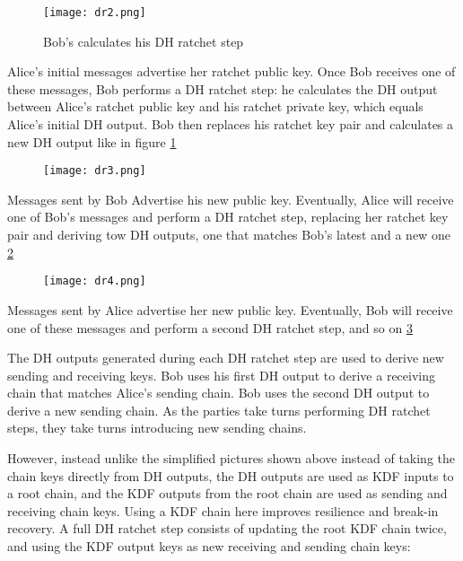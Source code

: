 \begin{figure}[ht!]
  \centering
  \texttt{[image: dr2.png]}
  \caption{Bob's calculates his DH ratchet step}
  \label{fig:dr2}
\end{figure}

Alice's initial messages advertise her ratchet public key. Once Bob receives one of these messages, Bob performs a DH ratchet step: he calculates the DH output between Alice's ratchet public key and his ratchet private key, which equals Alice's initial DH output. Bob then replaces his ratchet key pair and calculates a new DH output like in figure \ref{fig:dr2}

\newpage

\begin{figure}[ht!]
  \centering
  \texttt{[image: dr3.png]}
  \caption{}
  \label{fig:dr3}
\end{figure}

Messages sent by Bob Advertise his new public key. Eventually, Alice will receive one of Bob's messages and perform a DH ratchet step, replacing her ratchet key pair and deriving tow DH outputs, one that matches Bob's latest and a new one \ref{fig:dr3}

\begin{figure}[ht!]
  \centering
  \texttt{[image: dr4.png]}
  \caption{}
  \label{fig:dr4}
\end{figure}

Messages sent by Alice advertise her new public key. Eventually, Bob will receive one of these messages and perform a second DH ratchet step, and so on \ref{fig:dr4}

The DH outputs generated during each DH ratchet step are used to derive new sending and receiving keys. Bob uses his first DH output to derive a receiving chain that matches Alice's sending chain. Bob uses the second DH output to derive a new sending chain. As the parties take turns performing DH ratchet steps, they take turns introducing new sending chains.

However, instead unlike the simplified pictures shown above instead of taking the chain keys directly from DH outputs, the DH outputs are used as KDF inputs to a root chain, and the KDF outputs from the root chain are used as sending and receiving chain keys. Using a KDF chain here improves resilience and break-in recovery. A full DH ratchet step consists of updating the root KDF chain twice, and using the KDF output keys as new receiving and sending chain keys:


